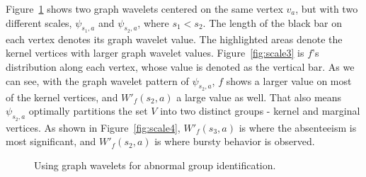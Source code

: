 Figure~\ref{fig:graphwaveletscale} shows two graph wavelets centered on the same vertex $v_a$, but with two different scales, $\psi_{s_1,a}$ and $\psi_{s_2, a}$, where $s_1<s_2$. The length of the black bar on each vertex denotes its graph wavelet value. The highlighted areas denote the kernel vertices with larger graph wavelet values.
Figure~\ref{fig:scale3} is $f$'s distribution along each vertex, whose value is denoted as the vertical bar. As we can see, with the graph wavelet pattern of $\psi_{s_2,a}$, $f$ shows a larger value on most of the kernel vertices, and $W'_f(s_2,a)$ a large value as well. That also means $\psi_{s_2,a}$ optimally partitions the set $V$ into two distinct groups - kernel and marginal vertices. As shown in Figure~\ref{fig:scale4}, $W'_f(s_3,a)$ is where the absenteeism is most significant, and $W'_f(s_2,a)$ is  where bursty behavior is observed.

\begin{figure}[t]
	\centering
\vspace{-2mm}
	\caption{Using graph wavelets for abnormal group identification.}
	\label{fig:graphwaveletscale}
\end{figure}

